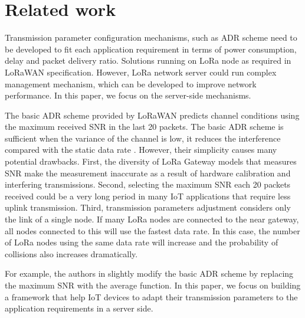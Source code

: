 \section{Related work} \label{sec:Related work}

Transmission parameter configuration mechanisms,
	such as \ac{ADR} scheme \cite{LorawanSpecification} need to be developed to fit each application requirement in terms of power consumption,
	delay and packet delivery ratio.
Solutions running on LoRa node  as required in LoRaWAN specification.
However,
	LoRa network server could run complex management mechanism,
	which can be developed to improve network performance.
In this paper, 
	we focus on the server-side mechanisms.


The basic \ac{ADR} scheme \cite{LorawanSpecification} provided by LoRaWAN predicts channel conditions using the maximum received \ac{SNR} in the last 20 packets.
The basic \ac{ADR} scheme is sufficient when the variance of the channel is low, 
	it reduces the interference compared with the static data rate \cite{bor_lora_2016}\cite{slabicki_adaptive_2018}.
However,
	their simplicity causes many potential drawbacks.
First,
	the diversity of LoRa Gateway models that measures \ac{SNR} make the measurement inaccurate as a result of hardware calibration and interfering transmissions.
Second,
	selecting the maximum \ac{SNR} each 20 packets received could be a very long period in many IoT applications that require less uplink transmission.
Third,
	transmission parameters adjustment considers only the link of a single node.
If many LoRa nodes are connected to the near gateway,
	all nodes connected to this  will use the fastest data rate.
In this case,
	the number of LoRa nodes using the same data rate will increase and the probability of collisions also increases dramatically.

For example,
	the authors in \cite{slabicki_adaptive_2018} slightly modify the basic \ac{ADR} scheme by replacing the maximum \ac{SNR} with the average function.
In this paper,
	we focus on building a framework that help IoT devices to adapt their transmission parameters to the application requirements in a server side.

